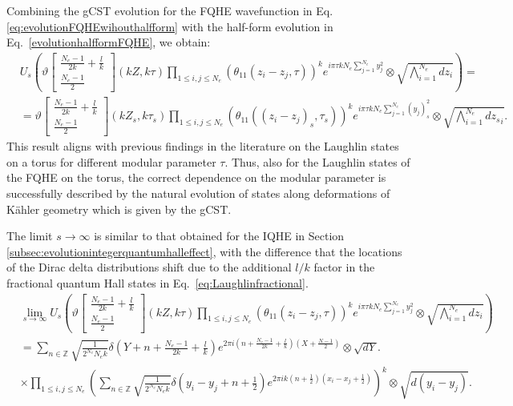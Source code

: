 \documentclass[a4paper,11pt]{article}
\begin{document}
Combining the gCST evolution for the FQHE wavefunction in Eq.\eqref{eq:evolutionFQHEwihouthalfform} with the half-form evolution in Eq.~\eqref{evolutionhalfformFQHE}, we obtain:
\begin{align*}
&U_{s}\left(\vartheta\begin{bmatrix}
\frac{N_e-1}{2k}+\frac{l}{k}\\
\frac{N_e-1}{2}
\end{bmatrix}(kZ,k\tau)\prod_{1\leq i,j\leq N_e}\left(\theta_{11}(z_{i}-z_{j},\tau)\right)^k e^{i\pi\tau k N_{e}\sum_{j=1}^{N_e}y_{j}^{2}}\otimes \sqrt{\bigwedge_{i=1}^{N_e} dz_{i}}\right) =\\
&=\vartheta\begin{bmatrix}
\frac{N_e-1}{2k}+\frac{l}{k}\\
\frac{N_e-1}{2}
\end{bmatrix}(kZ_s,k\tau_s)\prod_{1\leq i,j\leq N_e}\left(\theta_{11}((z_{i}-z_{j})_{s},\tau_s)\right)^k e^{i\pi\tau k N_{e}\sum_{j=1}^{N_e}(y_{j})_{s}^{2}} \otimes \sqrt{\bigwedge_{i=1}^{N_e}d{z_s}_{i}}.     
\end{align*}
This result aligns with previous findings in the literature on the Laughlin states on a torus for different modular parameter $\tau$. Thus, also for the Laughlin states of the FQHE on the torus, the correct dependence on the modular parameter is successfully described by the natural evolution of states along deformations of K\"ahler geometry which is given by the gCST.

The limit $s\rightarrow \infty$ is similar to that obtained for the IQHE in Section \ref{subsec:evolutionintegerquantumhalleffect}, with the difference that the locations of the Dirac delta distributions shift due to the additional $l/k$ factor in the fractional quantum Hall states in Eq.~\eqref{eq:Laughlinfractional}.
\begin{align*}
&\lim_{s\rightarrow \infty} U_{s}\left(\vartheta\begin{bmatrix}
\frac{N_e-1}{2k}+\frac{l}{k}\\
\frac{N_e-1}{2}
\end{bmatrix}(kZ,k\tau)\prod_{1\leq i,j\leq N_e}(\theta_{11}(z_{i}-z_{j},\tau))^{k}e^{i\pi\tau k N_{e}\sum_{j=1}^{N_e}y_{j}^{2}}\otimes \sqrt{\bigwedge_{i=1}^{N_e} dz_{i}}\right) \\
&=\sum_{n\in\mathbb{Z}}\sqrt{\frac{1}{2^{N_e}N_{e}k}}\delta\left(Y+n+\frac{N_{e}-1}{2k}+\frac{l}{k}\right)e^{2\pi i\left(n+\frac{N_{e}-1}{2k}+\frac{l}{k}\right)\left(X+\frac{N-1}{2}\right)}\otimes \sqrt{dY}.\\
&\times \prod_{1\leq i,j\leq N_{e}}\left(\sum_{n\in\mathbb{Z}}\sqrt{\frac{1}{2^{N_e}N_{e}k}}\delta\left(y_{i}-y_{j}+n+\frac{1}{2}\right)e^{2\pi ik\left(n+\frac{1}{2}\right)\left(x_{i}-x_{j}+\frac{1}{2}\right)}\right)^k \otimes \sqrt{d(y_{i}-y_{j})}. 
\end{align*}
\end{document}
